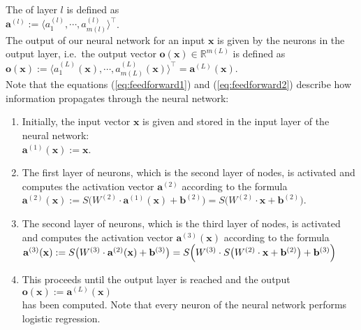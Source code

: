 The  of layer $l$ is defined as
\\[0.2cm]
\hspace*{1.3cm}
$\mathbf{a}^{(l)} := \langle a_1^{(l)}, \cdots, a_{m(l)}^{(l)} \rangle^\top$.
\\[0.2cm]
The output of our neural network for an input $\mathbf{x}$ is given by the neurons in the output
layer,  i.e.~the output vector 
$\mathbf{o}(\mathbf{x}) \in \mathbb{R}^{m(L)}$ is defined as 
\\[0.2cm]
\hspace*{1.3cm}
$\mathbf{o}(\mathbf{x}) := \langle a^{(L)}_1(\mathbf{x}), \cdots, a^{(L)}_{m(L)}(\mathbf{x}) \rangle^\top = \mathbf{a}^{(L)}(\mathbf{x})$.
\\[0.2cm]
Note that the equations (\ref{eq:feedforward1}) and (\ref{eq:feedforward2}) describe how information propagates
through the neural network: 
\begin{enumerate}
\item Initially, the input vector $\mathbf{x}$ is given and stored in the input layer of the neural network:
      \\[0.2cm]
      \hspace*{1.3cm}
      $\mathbf{a}^{(1)}(\mathbf{x}) := \mathbf{x}$.
\item The first layer of neurons, which is the second layer of nodes,  is activated and computes the activation
      vector $\mathbf{a}^{(2)}$ according to the formula
      \\[0.2cm]
      \hspace*{1.3cm}
      $\mathbf{a}^{(2)}(\mathbf{x}) := S\bigl(W^{(2)} \cdot \mathbf{a}^{(1)}(\mathbf{x}) + \mathbf{b}^{(2)}\bigr) = 
                                        S\bigl(W^{(2)} \cdot \mathbf{x} + \mathbf{b}^{(2)}\bigr)
      $.
\item The second layer of neurons, which is the third layer of nodes,  is activated and computes the activation
      vector $\mathbf{a}^{(3)}(\mathbf{x})$ according to the formula
      \\[0.2cm]
      \hspace*{1.3cm}
      $\mathbf{a}^{(3)}(\mathbf{x}) := S\bigl(W^{(3)} \cdot \mathbf{a}^{(2)}(\mathbf{x}) + \mathbf{b}^{(3)}\bigr)
                          = S\Bigl(W^{(3)} \cdot S\bigl(W^{(2)} \cdot \mathbf{x} + \mathbf{b}^{(2)}\bigr) + \mathbf{b}^{(3)}\Bigr)
        $
\item This proceeds until the output layer is reached and the output
      \\[0.2cm]
      \hspace*{1.3cm}
      $\mathbf{o}(\mathbf{x}) := \mathbf{a}^{(L)}(\mathbf{x})$
      \\[0.2cm]
      has been computed.  Note that every neuron of the neural network performs logistic regression.
\end{enumerate}

